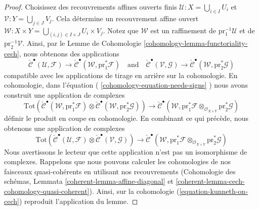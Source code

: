 \begin{proof}
\medskip\noindent
Choisissez des recouvrements affines ouverts finis
$\mathcal{U} : X = \bigcup_{i \in I} U_i$ et
$\mathcal{V} : Y = \bigcup_{j \in J} V_j$. Cela
détermine un recouvrement affine ouvert $\mathcal{W} : X
\times Y = \bigcup_{(i, j) \in I \times J} U_i \times
V_j$. Notez que $\mathcal{W}$ est un raffinement de
$\text{pr}_1^{-1}\mathcal{U}$ et de
$\text{pr}_2^{-1}\mathcal{V}$. Ainsi, par le Lemme de Cohomologie
\ref{cohomology-lemma-functoriality-cech}, nous obtenons des applications
$$
\check{\mathcal{C}}^\bullet(\mathcal{U}, \mathcal{F}) \to
\check{\mathcal{C}}^\bullet(\mathcal{W}, \text{pr}_1^*\mathcal{F})
\quad\text{and}\quad
\check{\mathcal{C}}^\bullet(\mathcal{V}, \mathcal{G}) \to
\check{\mathcal{C}}^\bullet(\mathcal{W}, \text{pr}_2^*\mathcal{G})
$$
compatible avec les applications de tirage en arrière sur la
cohomologie. En cohomologie, dans l'équation (
\ref{cohomology-equation-needs-signs} ) nous avons construit une application de complexes
$$
\text{Tot}(
\check{\mathcal{C}}^\bullet(\mathcal{W}, \text{pr}_1^*\mathcal{F})
\otimes
\check{\mathcal{C}}^\bullet(\mathcal{W}, \text{pr}_2^*\mathcal{G}))
\longrightarrow
\check{\mathcal{C}}^\bullet(\mathcal{W},
\text{pr}_1^*\mathcal{F} \otimes_{\mathcal{O}_{X \times Y}}
\text{pr}_2^*\mathcal{G})
$$
définir le produit en coupe en cohomologie. En combinant
ce qui précède, nous obtenons une application de complexes
\begin{equation}
\label{equation-kunneth-on-cech}
\text{Tot}(
\check{\mathcal{C}}^\bullet(\mathcal{U}, \mathcal{F})
\otimes
\check{\mathcal{C}}^\bullet(\mathcal{V}, \mathcal{G}))
\longrightarrow
\check{\mathcal{C}}^\bullet(\mathcal{W},
\text{pr}_1^*\mathcal{F} \otimes_{\mathcal{O}_{X \times Y}}
\text{pr}_2^*\mathcal{G})
\end{equation}
Nous avertissons le lecteur que cette application
n'est pas un isomorphisme de complexes. Rappelons que
nous pouvons calculer les cohomologies de nos
faisceaux quasi-cohérents en utilisant nos
recouvrements (Cohomologie des schémas, Lemmata
\ref{coherent-lemma-affine-diagonal} et
\ref{coherent-lemma-cech-cohomology-quasi-coherent}). Ainsi, sur la
cohomologie (\ref{equation-kunneth-on-cech}) reproduit l'application du lemme.


\end{proof}

